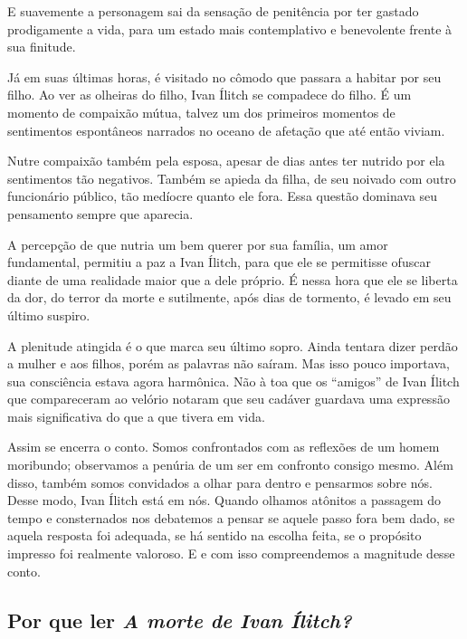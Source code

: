 \documentclass[12pt]{extarticle}
\begin{document}
E suavemente a personagem sai da sensação de penitência por ter
gastado prodigamente a vida, para um estado mais contemplativo e
benevolente frente à sua finitude.

Já em suas últimas horas, é visitado no cômodo que passara a habitar por
seu filho. Ao ver as olheiras do filho, Ivan Ílitch se compadece do
filho. É um momento de compaixão mútua, talvez um dos primeiros momentos
de sentimentos espontâneos narrados no oceano de afetação que até então
viviam.

Nutre compaixão também pela esposa, apesar de dias antes ter nutrido por
ela sentimentos tão negativos. Também se apieda da filha, de 
seu noivado com outro funcionário público,
tão medíocre quanto ele fora. Essa questão 
dominava seu pensamento sempre que aparecia.

A percepção de que nutria um bem
querer por sua família, um amor fundamental, permitiu a
paz a Ivan Ílitch, para que ele se permitisse ofuscar diante de uma
realidade maior que a dele próprio. É nessa hora que ele se liberta da dor,
do terror da morte e sutilmente, após dias de tormento, é levado em
seu último suspiro.

A plenitude atingida é o que marca seu último sopro. Ainda tentara dizer
perdão a mulher e aos filhos, porém as palavras não saíram. Mas isso
pouco importava, sua consciência estava agora harmônica.
Não à toa que os ``amigos'' de Ivan Ílitch que compareceram ao velório
notaram que seu cadáver guardava uma expressão mais significativa do que
a que tivera em vida.




Assim se encerra o conto. Somos confrontados com as reflexões de
um homem moribundo; observamos a penúria de um ser em confronto consigo
mesmo. Além disso, também somos convidados a olhar para dentro e pensarmos
sobre nós. Desse modo, Ivan Ílitch está em nós. Quando olhamos atônitos
a passagem do tempo e consternados nos debatemos a pensar se aquele
passo fora bem dado, se aquela resposta foi adequada, se há sentido na
escolha feita, se o propósito impresso foi realmente valoroso. 
E e com isso compreendemos a magnitude desse conto.

\subsection{Por que ler \emph{A morte de Ivan Ílitch?}}
\end{document}
